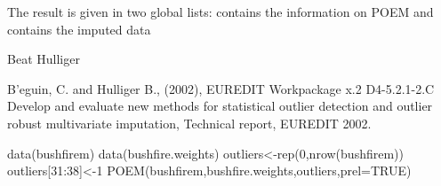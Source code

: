 %
\begin{Value}
The result is given in two global lists:  contains the information 
on POEM and  contains the imputed data
\end{Value}
%
\begin{Author}\relax
 Beat Hulliger
\end{Author}
%
\begin{References}\relax
B\bsl{}'eguin, C. and Hulliger B., (2002),
EUREDIT Workpackage x.2 D4-5.2.1-2.C
Develop and evaluate new methods for statistical outlier 
detection and outlier robust multivariate imputation,
Technical report, EUREDIT 2002.

\end{References}
%
\begin{Examples}
\begin{ExampleCode}
data(bushfirem)
data(bushfire.weights)
outliers<-rep(0,nrow(bushfirem))
outliers[31:38]<-1
POEM(bushfirem,bushfire.weights,outliers,prel=TRUE)
\end{ExampleCode}
\end{Examples}
